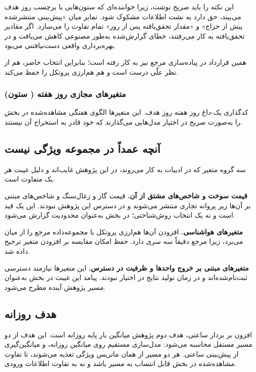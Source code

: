 این نکته را باید صریح نوشت، زیرا خواننده‌ای که ستون‌هایی با برچسب روز
هدف می‌بیند، حق دارد به نشت اطلاعات مشکوک شود. تمایز میان «پیش‌بینی
منتشرشده پیش از حراج» و «مقدار تحقق‌یافته پس از روز» تمام تفاوت را
می‌سازد. اگر مقادیر تحقق‌یافته به کار می‌رفتند، خطای گزارش‌شده به‌طور
مصنوعی کاهش می‌یافت و در بهره‌برداری واقعی دست‌نیافتنی می‌بود.

همین قرارداد در پیاده‌سازی مرجع نیز به کار رفته است؛ بنابراین انتخاب
حاضر، هم از نظر علّی درست است و هم هم‌ارزی پروتکل را حفظ می‌کند.

\subsubsection*{متغیرهای مجازی روز هفته ( ستون)}

کدگذاری یک-داغ روز هفته روز هدف. این متغیرها الگوی هفتگی مشاهده‌شده در
بخش  را به‌صورت صریح در اختیار مدل‌هایی می‌گذارند که خود
قادر به استخراج آن نیستند.

\subsection*{آنچه عمداً در مجموعه ویژگی نیست}

سه گروه متغیر که در ادبیات به کار می‌روند، در این پژوهش غایب‌اند و دلیل
غیبت هر یک متفاوت است.

\textbf{قیمت سوخت و شاخص‌های مشتق از آن.} قیمت گاز و زغال‌سنگ و
شاخص‌های مبتنی بر آن‌ها زیر پروانه تجاری منتشر می‌شوند و در دسترس این
پژوهش نبودند. این یک قید است و نه یک انتخاب روش‌شناختی؛ در بخش 
به‌عنوان محدودیت گزارش می‌شود.

\textbf{متغیرهای هواشناسی.} افزودن آن‌ها هم‌ارزی پروتکل با مجموعه‌داده
مرجع را از میان می‌برد، زیرا مرجع دقیقاً سه سری دارد. حفظ امکان مقایسه
بر افزودن متغیر ترجیح داده شد.

\textbf{متغیرهای مبتنی بر خروج واحدها و ظرفیت در دسترس.} این متغیرها
نیازمند دسترسی ثبت‌نام‌شده‌اند و در زمان تولید نتایج در اختیار نبودند.
پیامد این غیبت در بخش  به‌عنوان مسیر پژوهش آینده مطرح می‌شود.

\subsection*{هدف روزانه}

افزون بر بردار ساعتی، هدف دوم پژوهش میانگین بار پایه روزانه است. این هدف
از دو مسیر مستقل محاسبه می‌شود: مدل‌سازی مستقیم روی میانگین روزانه، و
میانگین‌گیری از  پیش‌بینی ساعتی. هر دو مسیر از همان ماتریس ویژگی
تغذیه می‌شوند، تا تفاوت مشاهده‌شده در بخش  قابل انتساب به مسیر
باشد و نه به تفاوت اطلاعات ورودی.

